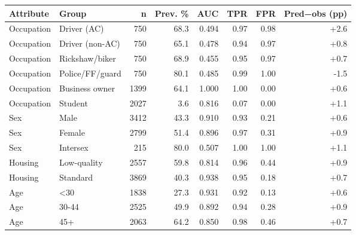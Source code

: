 \begin{tabular}{llrrrrrr}
\toprule
Attribute & Group & n & Prev. \% & AUC & TPR & FPR & Pred−obs (pp) \\
\midrule
Occupation & Driver (AC) & 750 & 68.3 & 0.494 & 0.97 & 0.98 & +2.6 \\
Occupation & Driver (non-AC) & 750 & 65.1 & 0.478 & 0.94 & 0.97 & +0.8 \\
Occupation & Rickshaw/biker & 750 & 68.9 & 0.455 & 0.95 & 0.97 & +0.7 \\
Occupation & Police/FF/guard & 750 & 80.1 & 0.485 & 0.99 & 1.00 & -1.5 \\
Occupation & Business owner & 1399 & 64.1 & 1.000 & 1.00 & 0.00 & +0.6 \\
Occupation & Student & 2027 & 3.6 & 0.816 & 0.07 & 0.00 & +1.1 \\
Sex & Male & 3412 & 43.3 & 0.910 & 0.93 & 0.21 & +0.6 \\
Sex & Female & 2799 & 51.4 & 0.896 & 0.97 & 0.31 & +0.9 \\
Sex & Intersex & 215 & 80.0 & 0.507 & 1.00 & 1.00 & +1.1 \\
Housing & Low-quality & 2557 & 59.8 & 0.814 & 0.96 & 0.44 & +0.9 \\
Housing & Standard & 3869 & 40.3 & 0.938 & 0.95 & 0.18 & +0.7 \\
Age & <30 & 1838 & 27.3 & 0.931 & 0.92 & 0.13 & +0.6 \\
Age & 30-44 & 2525 & 49.9 & 0.892 & 0.94 & 0.28 & +0.9 \\
Age & 45+ & 2063 & 64.2 & 0.850 & 0.98 & 0.46 & +0.7 \\
\bottomrule
\end{tabular}
